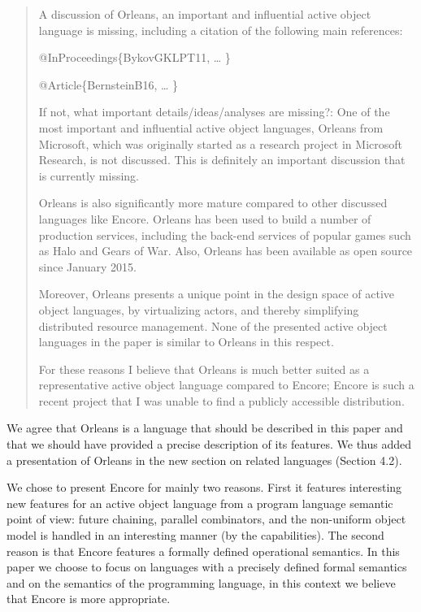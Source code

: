 \documentclass{article}
\begin{document}
\begin{quote}
	 A discussion of Orleans, an important and 
influential active object language is missing, including a citation of the following main 
references:

@InProceedings\{BykovGKLPT11,
\ldots
\}

@Article\{BernsteinB16,
\ldots
\}


If not, what important details/ideas/analyses are missing?: One of the most important and 
influential active object languages, Orleans from Microsoft, which was originally started 
as a research project in Microsoft Research, is not discussed. This is definitely an 
important discussion that is currently missing.

Orleans is also significantly more mature compared to other discussed languages like 
Encore. Orleans has been used to build a number of production services, including the 
back-end services of popular games such as Halo and Gears of War. Also, Orleans has been 
available as open source since January 2015.

Moreover, Orleans presents a unique point in the design space of active object languages, 
by virtualizing actors, and thereby simplifying distributed resource management. None of 
the presented active object languages in the paper is similar to Orleans in this respect.

For these reasons I believe that Orleans is much better suited as a representative active 
object language compared to Encore; Encore is such a recent project that I was unable to 
find a publicly accessible distribution.

\end{quote}
We agree that Orleans is a language that should be described in this paper and that we 
should have provided a precise description of its features.
We thus added a presentation of Orleans in the new section on related languages 
(Section 4.2).

We chose to present Encore for mainly two reasons. First it 
features interesting new features for an active object language from a program language 
semantic point of view: future chaining, parallel combinators, and the 
non-uniform object model is handled in an interesting manner (by the capabilities). The 
second reason is that 
Encore features a formally defined operational semantics. 
In this paper we choose to focus on languages with a precisely defined formal semantics 
and on the  semantics of the programming language, in this context we believe 
that Encore is more appropriate. 
\end{document}
